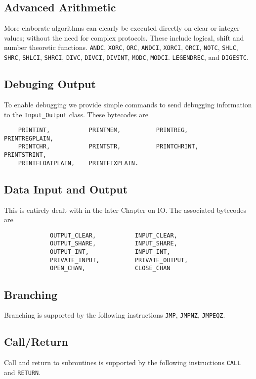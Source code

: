 \subsection{Advanced Arithmetic}
More elaborate algorithms can clearly be executed directly on
clear or integer values; without the need for complex
protocols. These include logical, shift and number
theoretic functions.
    \verb+ANDC+,
    \verb+XORC+,
    \verb+ORC+,
    \verb+ANDCI+,
    \verb+XORCI+,
    \verb+ORCI+,
    \verb+NOTC+,
    \verb+SHLC+,
    \verb+SHRC+,
    \verb+SHLCI+,
    \verb+SHRCI+,
    \verb+DIVC+,
    \verb+DIVCI+,
    \verb+DIVINT+,
    \verb+MODC+,
    \verb+MODCI+.
    \verb+LEGENDREC+,
and
    \verb+DIGESTC+.

\subsection{Debuging Output}
To enable debugging we provide simple commands to send
debugging information to the \verb+Input_Output+ class.
These bytecodes are
\begin{verbatim}
    PRINTINT,           PRINTMEM,          PRINTREG,           PRINTREGPLAIN,
    PRINTCHR,           PRINTSTR,          PRINTCHRINT,        PRINTSTRINT,
    PRINTFLOATPLAIN,    PRINTFIXPLAIN.
\end{verbatim}

\subsection{Data Input and Output}
This is entirely dealt with in the later Chapter on IO.
The associated bytecodes are
\begin{verbatim}
             OUTPUT_CLEAR,           INPUT_CLEAR, 
             OUTPUT_SHARE,           INPUT_SHARE, 
             OUTPUT_INT,             INPUT_INT,
             PRIVATE_INPUT,          PRIVATE_OUTPUT,
             OPEN_CHAN,              CLOSE_CHAN
\end{verbatim}

\subsection{Branching}
Branching is supported by the following
instructions
 \verb+JMP+,
    \verb+JMPNZ+,
    \verb+JMPEQZ+.

\subsection{Call/Return}
Call and return to subroutines is supported by the following
instructions
\verb+CALL+ and \verb+RETURN+.

